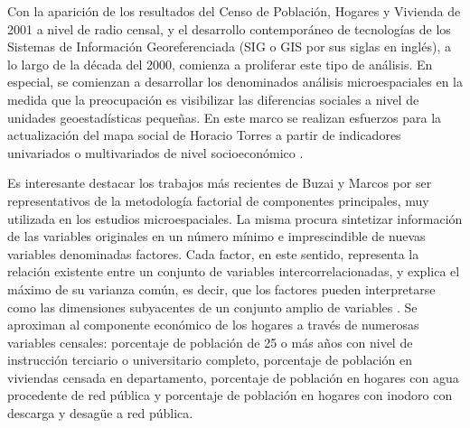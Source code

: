 Con la aparición de los resultados del Censo de Población, Hogares y Vivienda de 2001 a nivel de radio censal, y el desarrollo contemporáneo de tecnologías de los Sistemas de Información Georeferenciada (SIG o GIS por sus siglas en inglés), a lo largo de la década del 2000, comienza a proliferar este tipo de análisis. En especial, se comienzan a desarrollar los denominados análisis microespaciales en la medida que la preocupación es visibilizar las diferencias sociales a nivel de unidades geoestadísticas pequeñas. En este marco se realizan esfuerzos para la  actualización del mapa social de Horacio Torres a partir de indicadores univariados o multivariados de nivel socioeconómico \cite{thuiller,groisman,marcos2011,marcos2015,buzaimarcos2014,abba}.



Es interesante destacar los trabajos más recientes de Buzai y Marcos \cite{buzaimarcos2014,marcos2015} por ser representativos de la metodología factorial de componentes principales, muy utilizada en los estudios microespaciales. La misma procura sintetizar información de las variables originales en un número mínimo e imprescindible de nuevas variables denominadas factores. Cada factor, en este sentido, representa la relación existente entre un conjunto de variables intercorrelacionadas, y explica el máximo de su varianza común, es decir, que los factores pueden interpretarse como las dimensiones subyacentes de un conjunto amplio de variables \cite{marcos2015}.  Se aproximan al componente económico de los hogares a través de numerosas variables censales: porcentaje de población de 25 o más años con nivel de instrucción terciario o universitario completo, porcentaje de población en viviendas censada en departamento, porcentaje de población en hogares con agua procedente de red pública y porcentaje de población en hogares con inodoro con descarga y desagüe a red pública. 




